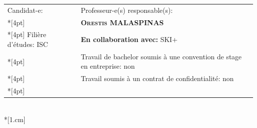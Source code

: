 \begin{spacing}{0.92}
\vfill
\begin{center}

\vfill

{
	\begin{tabular*}{16cm}{p{7.59cm} p{7.58cm}}
		\small Candidat-e:					&	\small Professeur-e(s) responsable(s):\\*[4pt]
		\small\textbf{\textsc{\Author}}		&	\small\textbf{\textsc{Orestis MALASPINAS}}\\*[4pt]
		\footnotesize  Filière d'études: ISC	&	\footnotesize  \textbf{En collaboration avec:} SKI+\\*[4pt]
		\footnotesize  {} & \footnotesize  Travail de bachelor soumis à une convention de stage en entreprise: non \\*[4pt]
		\footnotesize  {} & \footnotesize  Travail soumis à un contrat de confidentialité: non\\*[4pt]
	\end{tabular*}\\*[1.cm]
}
	
\end{center}
\end{spacing}

